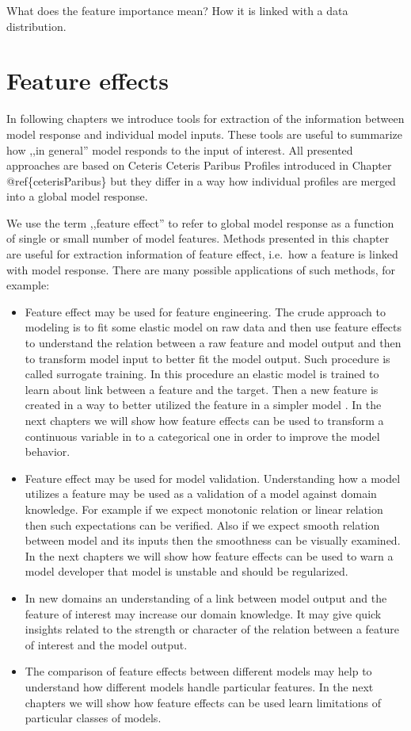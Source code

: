 \documentclass[12pt,]{krantz}
\providecommand{\tightlist}{%
  \setlength{\itemsep}{0pt}\setlength{\parskip}{0pt}}
\theoremstyle{definition}
\theoremstyle{definition}
\theoremstyle{definition}
\theoremstyle{remark}
\begin{document}
What does the feature importance mean? How it is linked with a data
distribution.

\hypertarget{variableEngeneering}{%
\section{Feature effects}\label{variableEngeneering}}

In following chapters we introduce tools for extraction of the
information between model response and individual model inputs. These
tools are useful to summarize how ,,in general'' model responds to the
input of interest. All presented approaches are based on Ceteris Ceteris
Paribus Profiles introduced in Chapter @ref\{ceterisParibus\} but they
differ in a way how individual profiles are merged into a global model
response.

We use the term ,,feature effect'' to refer to global model response as
a function of single or small number of model features. Methods
presented in this chapter are useful for extraction information of
feature effect, i.e.~how a feature is linked with model response. There
are many possible applications of such methods, for example:

\begin{itemize}
\tightlist
\item
  Feature effect may be used for feature engineering. The crude approach
  to modeling is to fit some elastic model on raw data and then use
  feature effects to understand the relation between a raw feature and
  model output and then to transform model input to better fit the model
  output. Such procedure is called surrogate training. In this procedure
  an elastic model is trained to learn about link between a feature and
  the target. Then a new feature is created in a way to better utilized
  the feature in a simpler model \citep{SAFE-arxiv}. In the next
  chapters we will show how feature effects can be used to transform a
  continuous variable in to a categorical one in order to improve the
  model behavior.
\item
  Feature effect may be used for model validation. Understanding how a
  model utilizes a feature may be used as a validation of a model
  against domain knowledge. For example if we expect monotonic relation
  or linear relation then such expectations can be verified. Also if we
  expect smooth relation between model and its inputs then the
  smoothness can be visually examined. In the next chapters we will show
  how feature effects can be used to warn a model developer that model
  is unstable and should be regularized.
\item
  In new domains an understanding of a link between model output and the
  feature of interest may increase our domain knowledge. It may give
  quick insights related to the strength or character of the relation
  between a feature of interest and the model output.
\item
  The comparison of feature effects between different models may help to
  understand how different models handle particular features. In the
  next chapters we will show how feature effects can be used learn
  limitations of particular classes of models.
\end{itemize}
\end{document}
